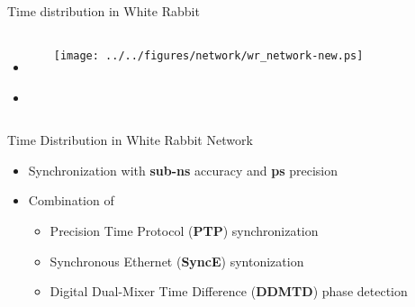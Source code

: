 \documentclass[compress,red]{beamer}
\begin{document}
\subsection{}
\begin{frame}{Time distribution in White Rabbit}


\begin{columns}[c]
 
  \begin{itemize}
    \item \textbf{\color{blue!90}{High accuracy/precision synchronization}}
    \item \color{gray}{Deterministic, reliable and low-latency Control Data delivery}
  \end{itemize}

    \begin{center}
    \texttt{[image: ../../figures/network/wr\_network-new.ps]}
    \end{center}
\end{columns}

\end{frame}
\begin{frame}{Time Distribution in White Rabbit Network}

  \begin{itemize}
    \item Synchronization with {\bf sub-ns} accuracy and {\bf ps} precision
    \item Combination of
	\begin{itemize}
	  \item Precision Time Protocol ({\bf PTP}) synchronization
	  \item Synchronous Ethernet ({\bf SyncE}) syntonization
	  \item Digital Dual-Mixer Time Difference ({\bf DDMTD}) phase detection
	\end{itemize}
  \end{itemize}
\end{frame}
\end{document}
